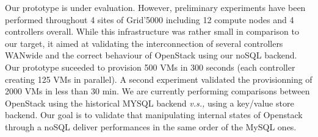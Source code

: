 Our prototype is under evaluation. However, preliminary experiments  have been
performed throughout 4 sites of Grid'5000  including 12 compute nodes  and 4
controllers overall. While this infrastructure was rather small in comparison to
our target, it aimed at validating the interconnection of several controllers
WANwide and the correct behaviour of  OpenStack using our noSQL backend. Our
prototype suceeded to provision 500 VMs in 300 seconds (each controller creating
125 VMs in parallel). A second experiment validated the provisionning of 2000
VMs in less than 30 min.  We are currently performing comparisons between
OpenStack using the historical MYSQL backend \textit{v.s.,} using a key/value
store backend. Our goal is to validate that manipulating internal states of
Openstack through a noSQL deliver performances in the same order of the MySQL
ones.
